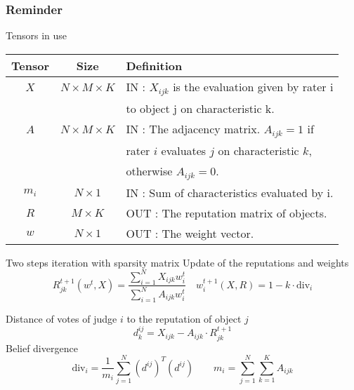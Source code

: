 \begin{frame}[allowframebreaks]
\frametitle{Reminder}
\begin{block}{Tensors in use}
\centering
\begin{tabular}{@{}ccl@{}}
\hline
Tensor & Size                  & Definition                                                                                                     \\ \hline
$X$    & $N \times M \times K$ & IN : $X_{ijk}$ is the evaluation given by rater i\\
          &                                     &  to object j on characteristic k. \\
$A$    & $N \times M \times K$ & IN : The adjacency matrix. $A_{ijk} = 1$ if \\
          &                                & rater $i$ evaluates $j$ on characteristic $k$, \\
          &                                & otherwise $A_{ijk} = 0$. \\
$m_i$ & $N \times 1$          & IN : Sum of characteristics evaluated by i. \\                                                        
$R$    & $M \times K$          & OUT : The reputation matrix of objects. \\
$w$    & $N \times 1$          & OUT : The weight vector.     \\
\end{tabular}
\end{block}

\framebreak

    \begin{block}{Two steps iteration with sparsity matrix}
    Update of the reputations and weights
        \[
            R_{jk}^{t+1}(w^t,X) = \frac{\sum_{i=1}^N X_{ijk}w^t_{i}}{\sum_{i=1}^{N} A_{ijk} w^t_{i}} \quad 
        	w_i^{t+1}(X,R) = 1 -k \cdot \mathrm{div}_i \]

    \end{block}
    
    
    \begin{block}{}
    Distance of votes of judge $i$ to the reputation of object $j$
    \[d^{ij}_k= X_{ijk}-A_{ijk}\cdot R^{t+1}_{jk} \]
    Belief divergence
    \[ \mathrm{div}_i =  \frac{1}{m_i}\sum_{j=1}^N (d^{ij})^T (d^{ij}) \qquad m_i = \sum_{j=1}^{N} \sum_{k=1}^{K} A_{ijk} \]
    \end{block}
\end{frame}


